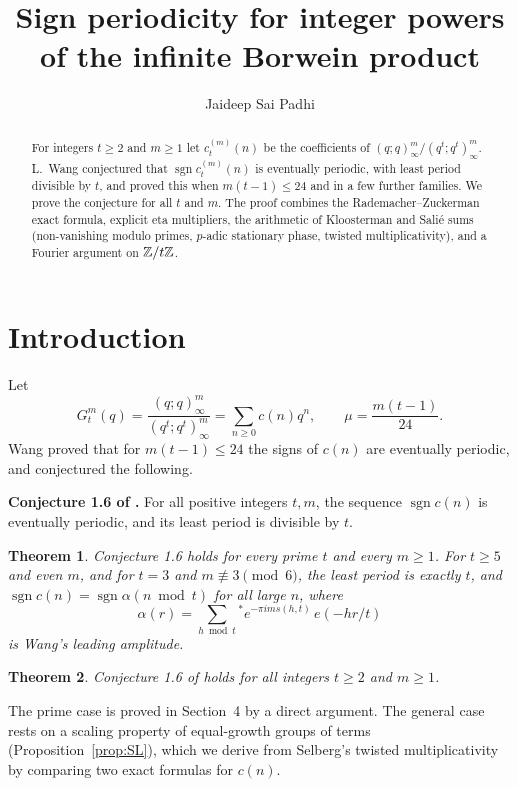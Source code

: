 \documentclass[11pt]{amsart}
\title[Sign periodicity for powers of the infinite Borwein product]{Sign periodicity for integer powers of the infinite Borwein product}
\author{Jaideep Sai Padhi}
\newtheorem{theorem}{Theorem}\newtheorem{lemma}[theorem]{Lemma}\newtheorem{proposition}[theorem]{Proposition}
\begin{document}
\begin{abstract}
For integers $t\ge2$ and $m\ge1$ let $c_t^{(m)}(n)$ be the coefficients of $(q;q)_\infty^m/(q^t;q^t)_\infty^m$. L.~Wang conjectured that $\operatorname{sgn}c_t^{(m)}(n)$ is eventually periodic, with least period divisible by $t$, and proved this when $m(t-1)\le24$ and in a few further families.
We prove the conjecture for all $t$ and $m$.
The proof combines the Rademacher--Zuckerman exact formula, explicit eta multipliers, the arithmetic of Kloosterman and Sali\'e sums (non-vanishing modulo primes, $p$-adic stationary phase, twisted multiplicativity), and a Fourier argument on $\mathbb Z/t\mathbb Z$.
\end{abstract}
\maketitle

\section{Introduction}
Let
\[
G_t^m(q)=\frac{(q;q)_\infty^m}{(q^t;q^t)_\infty^m}=\sum_{n\ge0}c(n)q^n,\qquad \mu=\frac{m(t-1)}{24}.
\]
Wang \cite{W} proved that for $m(t-1)\le24$ the signs of $c(n)$ are eventually periodic, and conjectured the following.

\medskip\noindent\textbf{Conjecture 1.6 of \cite{W}.} For all positive integers $t,m$, the sequence $\operatorname{sgn}c(n)$ is eventually periodic, and its least period is divisible by $t$.
\medskip

\begin{theorem}\label{thm:prime}
Conjecture 1.6 holds for every prime $t$ and every $m\ge1$. For $t\ge5$ and even $m$, and for $t=3$ and $m\not\equiv3\pmod6$, the least period is exactly $t$, and $\operatorname{sgn}c(n)=\operatorname{sgn}\alpha(n\bmod t)$ for all large $n$, where
\[
\alpha(r)=\sum_{h\bmod t}{}^{*}e^{-\pi i m s(h,t)}\,e(-hr/t)
\]
is Wang's leading amplitude.
\end{theorem}

\begin{theorem}\label{thm:all}
Conjecture 1.6 of \cite{W} holds for all integers $t\ge2$ and $m\ge1$.
\end{theorem}

The prime case is proved in Section~4 by a direct argument. The general case rests on a scaling property of equal-growth groups of terms (Proposition~\ref{prop:SL}), which we derive from Selberg's twisted multiplicativity by comparing two exact formulas for $c(n)$.
\end{document}
